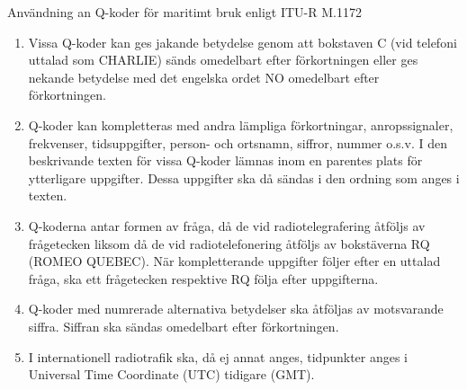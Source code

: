 Användning an Q-koder för maritimt bruk enligt ITU-R M.1172
\begin{enumerate}
	\item Vissa Q-koder kan ges jakande betydelse genom att bokstaven C
	(vid telefoni uttalad som CHARLIE) sänds omedelbart efter
	förkortningen eller ges nekande betydelse med det engelska ordet NO
	omedelbart efter förkortningen.
	\item Q-koder kan kompletteras med andra lämpliga förkortningar,
	anropssignaler, frekvenser, tidsuppgifter, person- och ortsnamn,
	siffror, nummer o.s.v. I den beskrivande texten för vissa Q-koder
	lämnas inom en parentes plats för ytterligare uppgifter. Dessa
	uppgifter ska då sändas i den ordning som anges i texten.
	\item Q-koderna antar formen av fråga, då de vid radiotelegrafering
	åtföljs av frågetecken liksom då de vid radiotelefonering åtföljs av
	bokstäverna RQ (ROMEO QUEBEC). När kompletterande uppgifter följer
	efter en uttalad fråga, ska ett frågetecken respektive RQ följa
	efter uppgifterna.
	\item Q-koder med numrerade alternativa betydelser ska åtföljas av
	motsvarande siffra. Siffran ska sändas omedelbart efter
	förkortningen.
	\item I internationell radiotrafik ska, då ej annat anges,
	tidpunkter anges i Universal Time Coordinate (UTC) tidigare (GMT).
\end{enumerate}